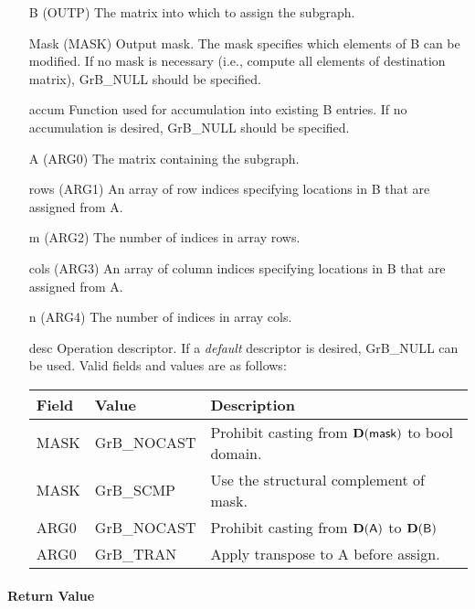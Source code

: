 \begin{itemize}[leftmargin=1.1in]
    \item[{\sf B}]   ({\sf OUTP}) The matrix into which to assign the subgraph.
    \item[{\sf Mask}] ({\sf MASK}) Output mask. The mask specifies which elements
    of {\sf B} can be modified. If no mask is necessary (i.e., compute all
    elements of destination matrix), {\sf GrB\_NULL} should be specified.
    \item[{\sf accum}] Function used for accumulation into existing {\sf B} entries.  If no accumulation
                        is desired, {\sf GrB\_NULL} should be specified.
    \item[{\sf A}]   ({\sf ARG0}) The matrix containing the subgraph.
    \item[{\sf rows}]     ({\sf ARG1}) An array of row indices specifying locations in {\sf B} that
                       are assigned from {\sf A}. 
    \item[{\sf m}]     ({\sf ARG2}) The number of indices in array {\sf rows}.
    \item[{\sf cols}]     ({\sf ARG3}) An array of column indices 
                       specifying locations in {\sf B} that are assigned from {\sf A}.
    \item[{\sf n}]	({\sf ARG4}) The number of indices in array {\sf cols}.
    \item[{\sf desc}]   Operation descriptor. If a
    \emph{default} descriptor is desired, {\sf GrB\_NULL} can be
    used. Valid fields and values are as follows: \\
    \begin{tabular}{lll}
    Field  & Value & Description \\
    \hline
    {\sf MASK} & {\sf GrB\_NOCAST} & Prohibit casting from $\bold{D}({\sf mask})$ to {\sf bool} domain. \\
    {\sf MASK} & {\sf GrB\_SCMP} & Use the structural complement of {\sf mask}. \\
    {\sf ARG0} & {\sf GrB\_NOCAST} & Prohibit casting from $\bold{D}({\sf A})$ to $\bold{D}({\sf B})$ \\
    {\sf ARG0} & {\sf GrB\_TRAN} & Apply transpose to {\sf A} before assign. \\
    \end{tabular}
\end{itemize}

\paragraph{Return Value}

